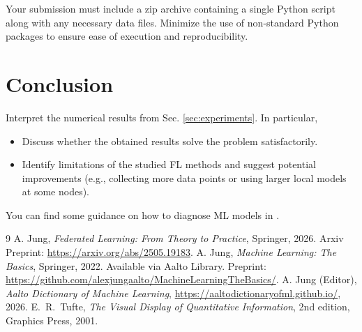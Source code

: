 \documentclass[9pt]{article}
\begin{document}
\begin{hintbox} 
Your submission must include a zip archive containing a single Python script along with any 
necessary data files. Minimize the use of non-standard Python packages to ensure ease of 
execution and reproducibility.
\end{hintbox} 


	
\section{Conclusion}
	\label{sec:conclusion}
\begin{hintbox}
Interpret the numerical results from Sec. \ref{sec:experiments}. 
In particular, 
\begin{itemize}
	\item Discuss whether the obtained results solve the problem satisfactorily.
	\item Identify limitations of the studied FL methods and suggest potential improvements (e.g., 
	collecting more data points or using larger local models at some nodes).
\end{itemize}
You can find some guidance on how to diagnose ML models in \cite[Sec.~6.6]{Jung2022}.
\end{hintbox}



	\begin{thebibliography}{9}
		 A. Jung, \textit{Federated Learning: From Theory to Practice}, Springer, 2026. Arxiv Preprint: \url{https://arxiv.org/abs/2505.19183}.
		 A. Jung, \textit{Machine Learning: The Basics}, Springer, 2022. Available via Aalto Library. Preprint: \url{https://github.com/alexjungaalto/MachineLearningTheBasics/}. 
		 A. Jung (Editor),  \textit{Aalto Dictionary of Machine Learning}, \url{https://aaltodictionaryofml.github.io/}, 2026.
		E.~R.~Tufte,
		\emph{The Visual Display of Quantitative Information},
		2nd edition, Graphics Press, 2001.
	\end{thebibliography}
	
\end{document}
